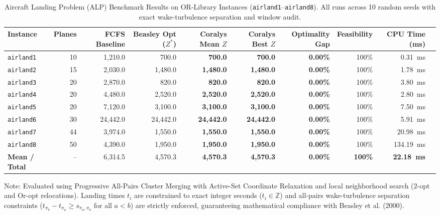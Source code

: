 \documentclass[10pt,journal,compsoc]{IEEEtran}
\begin{document}
\begin{table}[t]
\centering
\caption{Aircraft Landing Problem (ALP) Benchmark Results on OR-Library Instances (\texttt{airland1}--\texttt{airland8}). All runs across 10 random seeds with exact wake-turbulence separation and window audit.}
\label{tab:alp_results}
\small
\begin{tabular}{lrrrrrrrrr}
\toprule
\textbf{Instance} & \textbf{Planes} & \textbf{FCFS Baseline} & \textbf{Beasley Opt ($Z^*$)} & \textbf{Coralys Mean $Z$} & \textbf{Coralys Best $Z$} & \textbf{Optimality Gap} & \textbf{Feasibility} & \textbf{CPU Time (ms)} \\
\midrule
\texttt{airland1} & 10 & 1,210.0 & 700.0 & \textbf{700.0} & \textbf{700.0} & \textbf{0.00\%} & 100\% & 0.31~ms \\
\texttt{airland2} & 15 & 2,030.0 & 1,480.0 & \textbf{1,480.0} & \textbf{1,480.0} & \textbf{0.00\%} & 100\% & 1.78~ms \\
\texttt{airland3} & 20 & 2,870.0 & 820.0 & \textbf{820.0} & \textbf{820.0} & \textbf{0.00\%} & 100\% & 3.80~ms \\
\texttt{airland4} & 20 & 4,480.0 & 2,520.0 & \textbf{2,520.0} & \textbf{2,520.0} & \textbf{0.00\%} & 100\% & 2.80~ms \\
\texttt{airland5} & 20 & 7,120.0 & 3,100.0 & \textbf{3,100.0} & \textbf{3,100.0} & \textbf{0.00\%} & 100\% & 7.50~ms \\
\texttt{airland6} & 30 & 24,442.0 & 24,442.0 & \textbf{24,442.0} & \textbf{24,442.0} & \textbf{0.00\%} & 100\% & 5.91~ms \\
\texttt{airland7} & 44 & 3,974.0 & 1,550.0 & \textbf{1,550.0} & \textbf{1,550.0} & \textbf{0.00\%} & 100\% & 20.98~ms \\
\texttt{airland8} & 50 & 4,390.0 & 1,950.0 & \textbf{1,950.0} & \textbf{1,950.0} & \textbf{0.00\%} & 100\% & 134.19~ms \\
\midrule
\textbf{Mean / Total} & -- & 6,314.5 & 4,570.3 & \textbf{4,570.3} & \textbf{4,570.3} & \textbf{0.00\%} & \textbf{100\%} & \textbf{22.18~ms} \\
\bottomrule
\end{tabular}
\begin{flushleft}
\footnotesize{Note: Evaluated using Progressive All-Pairs Cluster Merging with Active-Set Coordinate Relaxation and local neighborhood search (2-opt and Or-opt relocations). Landing times $t_i$ are constrained to exact integer seconds ($t_i \in \mathbb{Z}$) and all-pairs wake-turbulence separation constraints ($t_{\pi_b} - t_{\pi_a} \ge s_{\pi_a, \pi_b}$ for all $a < b$) are strictly enforced, guaranteeing mathematical compliance with Beasley et al. (2000).}
\end{flushleft}
\end{table}
\end{document}
